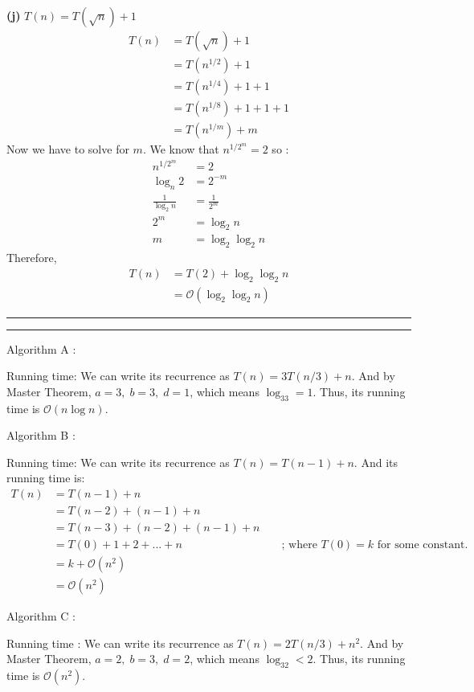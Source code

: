 \documentclass[a4paper, 12pt]{article}
\newcommand{\question}[1] {\vspace{.25in} \hrule\vspace{0.5em}
	\noindent{\bf #1} \vspace{0.5em}
	\hrule \vspace{.10in}}
\renewcommand{\part}[1] {\vspace{.10in} {\bf (#1)}}
\begin{document}
\part{j} $T(n) = T(\sqrt{n}) + 1$
\begin{align*}
	T(n) &= T(\sqrt{n}) + 1\\
	&= T(n^{1/2})+1\\
	&= T(n^{1/4}) + 1 + 1\\
	&= T(n^{1/8}) +1 +1 +1\\
	&= T(n^{1/m}) + m
\end{align*}
Now we have to solve for $m$. We know that $n^{1/2^m} = 2$ so :
\begin{align*}
	n^{1/2^m} &= 2\\
	\log_n 2&= 2^{-m}\\
	\frac{1}{\log_2 n} &= \frac{1}{2^m}\\
	2^m &= \log_2 n\\
	m &= \log_2 \log_2 n
\end{align*}
Therefore,
\begin{align*}
	T(n) &= T(2) + \log_2 \log_2 n\\
	&= \mathcal{O}(\log_2 \log_2 n)
\end{align*}

\question{Problem 2}

Algorithm A : 

Running time: We can write its recurrence as $T(n) = 3T(n/3) + n$. And by Master Theorem, $a = 3,\; b =3, \; d=1 $, which means $\log_33 = 1 $. Thus, its running time is $\mathcal{O}(n\log n)$.

Algorithm B :

Running time: We can write its recurrence as $T(n) = T(n-1) + n$. And its running time is:
\begin{align*}
	T(n) &= T(n-1) + n\\
	&= T(n-2) + (n-1) + n\\
	&= T(n-3) + (n-2) + (n-1) + n\\
	&= T(0) + 1 + 2 +...+n && \text{ ; where } T(0) = k \text{ for some constant.}\\
	&= k + \mathcal{O}(n^2)\\
	&= \mathcal{O}(n^2)	
\end{align*}

Algorithm C : 

Running time : We can write its recurrence as $T(n) = 2T(n/3) + n^2$. And by Master Theorem, $a = 2,\; b =3, \; d=2 $, which means $\log_32 < 2 $. Thus, its running time is $\mathcal{O}(n^2)$.
\end{document}
